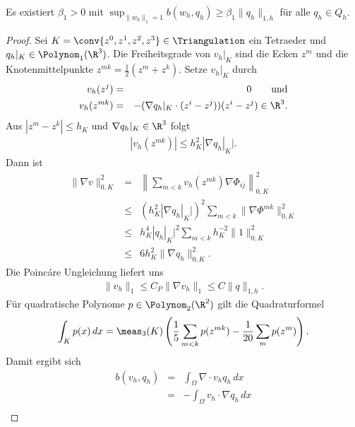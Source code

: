 \begin{Lemma}
    \label{lem:5.19}
    Es existiert $\beta_1 > 0$ mit $\sup_{\|w_h\|_1 = 1} b(w_h, q_h) \ge \beta_1
    \|q_h\|_{1,h}$ für alle $q_h\in Q_h$.
\end{Lemma}


\begin{proof}
    Sei $K = \conv\{z^0, z^1, z^2, z^3\}\in \Triangulation$ ein Tetraeder und
    $q_h|_K\in \Polynom_1(\R^3)$.
    Die Freiheitsgrade von $v_h|_K$ sind die Ecken $z^m$ und die
    Knotenmittelpunkte $z^{mk} = \frac{1}{2}(z^m + z^k)$.
    Setze $v_h|_K$ durch
    \begin{eqnarray*}
            v_h(z^j)
        &=& 0
            \qquad \text{und} \\
            v_h(z^{mk})
        &=& - (\nabla q_h|_K \cdot (z^i - z^j)) (z^i - z^j)\in \R^3.
    \end{eqnarray*}
    Aus $|z^m - z^k| \le h_K$ und $\nabla q_h|_K\in \R^3$ folgt
    \begin{eqnarray*}
            |v_h(z^{mk})|
        \le h_K^2 |\nabla q_h|_K|.
    \end{eqnarray*}
    Dann ist
    \begin{eqnarray*}
            \|\nabla v\|_{0,K}^2
        &=& \left\|\sum_{m < k} v_h(z^{mk}) \nabla \Phi_{ij}\right\|_{0,K}^2 \\
        &\le& (h_K^2 |\nabla q_h|_K|)^2 \sum_{m < k}
              \|\nabla \Phi^{mk}\|_{0,K}^2 \\
        &\le& h_K^4 |q_h|_K|^2 \sum_{m < k} h_K^{-2} \|1\|_{0,K}^2 \\
        &\le& 6 h_K^2 \|\nabla q_h\|_{0,K}^2.
    \end{eqnarray*}
    Die Poinc\'are Ungleichung liefert uns
    \begin{eqnarray*}
        \|v_h\|_1 \le C_P \|\nabla v_h\|_1 \le C \|q\|_{1,h}.
    \end{eqnarray*}
    Für quadratische Polynome $p\in \Polynom_2(\R^2)$ gilt die Quadraturformel
    \begin{eqnarray*}
          \int_K p(x) \,dx
        = \meas_3(K) \left(\frac{1}{5} \sum_{m < k} p(z^{mk}) - \frac{1}{20}
          \sum_m p(z^m)\right).
    \end{eqnarray*}
    Damit ergibt sich
    \begin{eqnarray*}
            b(v_h, q_h)
        &=& \int_\Omega \nabla \cdot v_h q_h \,dx \\
        &=& - \int_\Omega v_h \cdot \nabla q_h \,dx \\

\end{eqnarray*}
\end{proof}
